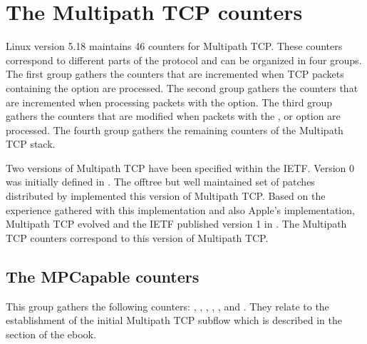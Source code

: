 \documentclass[letterpaper,10pt,english]{sphinxmanual}
\begin{document}
\chapter{The Multipath TCP counters}
\label{\detokenize{nstat-mptcp:the-multipath-tcp-counters}}\label{\detokenize{nstat-mptcp::doc}}
\sphinxAtStartPar
Linux version 5.18 maintains 46 counters for Multipath TCP. These counters
correspond to different parts of the protocol and can be organized in four
groups. The first group gathers the counters that are incremented when TCP
packets containing the  option are processed. The second group
gathers the counters that are incremented when processing packets with
the  option. The third group gathers the counters that are
modified when packets with the ,  or  option
are processed. The fourth group gathers the remaining counters of the
Multipath TCP stack.

\sphinxAtStartPar
Two versions of Multipath TCP have been specified within the IETF. Version
0 was initially defined in . The off\sphinxhyphen{}tree but well
maintained set of patches distributed by
 implemented
this version of Multipath TCP. Based on the experience gathered with this
implementation and also Apple’s implementation, Multipath TCP evolved and
the IETF published version 1 in . The Multipath TCP counters
correspond to this version of Multipath TCP.


\section{The MPCapable counters}
\label{\detokenize{nstat-mptcp:the-mpcapable-counters}}
\sphinxAtStartPar
This group gathers the following counters: ,
, ,
, ,
 and . They
relate to the establishment of the initial Multipath TCP subflow
which is described in the  section of the  ebook.
\end{document}
